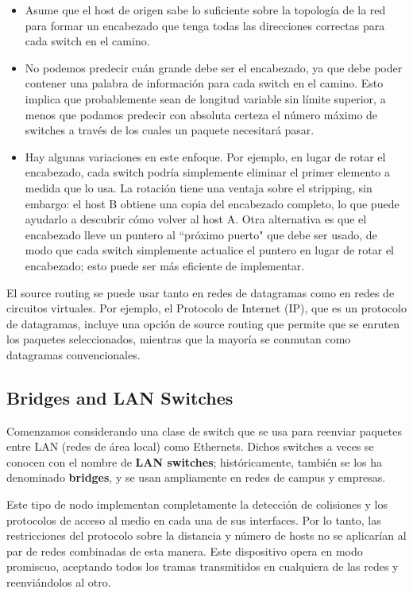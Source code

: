 \begin{itemize}
  \item Asume que el host de origen sabe lo suficiente sobre la topología de la red para formar un encabezado que tenga todas las direcciones correctas para cada switch en el camino.
  \item  No podemos predecir cuán grande debe ser el encabezado, ya que debe poder contener una palabra de información para cada switch en el camino. Esto implica que probablemente sean de longitud variable sin límite superior, a menos que podamos predecir con absoluta certeza el número máximo de switches a través de los cuales un paquete necesitará pasar.
  \item Hay algunas variaciones en este enfoque. Por ejemplo, en lugar de rotar el encabezado, cada switch podría simplemente eliminar el primer elemento a medida que lo usa. La rotación tiene una ventaja sobre el stripping, sin embargo: el host B obtiene una copia del encabezado completo, lo que puede ayudarlo a descubrir cómo volver al host A. Otra alternativa es que el encabezado lleve un puntero al ``próximo puerto" que debe ser usado, de modo que cada switch simplemente actualice el puntero en lugar de rotar el encabezado; esto puede ser más eficiente de implementar.
\end{itemize}

El source routing se puede usar tanto en redes de datagramas como en redes de circuitos virtuales. Por ejemplo, el Protocolo de Internet (IP), que es un protocolo de datagramas, incluye una opción de source routing que permite que se enruten los paquetes seleccionados, mientras que la mayoría se conmutan como datagramas convencionales.

\subsection{Bridges and LAN Switches}
Comenzamos considerando una clase de switch que se usa para reenviar paquetes entre LAN (redes de área local) como Ethernets. Dichos switches a veces se conocen con el nombre de \textbf{LAN switches}; históricamente, también se los ha denominado \textbf{bridges}, y se usan ampliamente en redes de campus y empresas.

Este tipo de nodo implementan completamente la detección de colisiones y los protocolos de acceso al medio en cada una de sus interfaces. Por lo tanto, las restricciones del protocolo sobre la distancia y número de hosts no se aplicarían al par de redes combinadas de esta manera. Este dispositivo opera en modo promiscuo, aceptando todos los tramas transmitidos en cualquiera de las redes y reenviándolos al otro.

